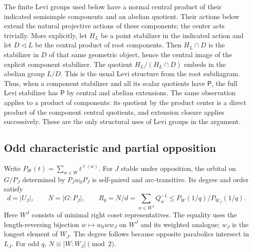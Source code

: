\documentclass[11pt]{article}
\theoremstyle{definition}
\newcommand{\Pp}{\mathsf P}
\begin{document}
The finite Levi groups used below have a normal central product of their indicated semisimple components and an abelian quotient. Their actions below extend the natural projective actions of these components; the center acts trivially. More explicitly, let $H_L$ be a point stabilizer in the indicated action and let $D\lhd L$ be the central product of root components. Then $H_L\cap D$ is the stabilizer in $D$ of that same geometric object, hence the central image of the explicit component stabilizer. The quotient $H_L/(H_L\cap D)$ embeds in the abelian group $L/D$. This is the usual Levi structure from the root subdiagram. Thus, when a component stabilizer and all its scalar quotients have $\Pp$, the full Levi stabilizer has $\Pp$ by central and abelian extensions. The same observation applies to a product of components: its quotient by the product center is a direct product of the component central quotients, and extension closure applies successively. These are the only structural uses of Levi groups in the argument.

\subsection{Odd characteristic and partial opposition}
Write $P_W(t)=\sum_{w\in W}t^{\ell(w)}$. For $J$ stable under opposition, the orbital on $G/P_J$ determined by $P_Jw_0P_J$ is self-paired and arc-transitive. Its degree and order satisfy
\begin{equation}\label{eq:oppositionratio}
d=|U_J|,\qquad N=|G:P_J|,\qquad
R_0=N/d=\sum_{w\in W^J}Q_w^{-1}
\le P_W(1/q)/P_{W_J}(1/q).
\end{equation}
Here $W^J$ consists of minimal right coset representatives. The equality uses the length-reversing bijection $w\mapsto w_0ww_J$ on $W^J$ and its weighted analogue; $w_J$ is the longest element of $W_J$. The degree follows because opposite parabolics intersect in $L_J$. For odd $q$, $N\equiv|W:W_J|\pmod2$.
\end{document}
